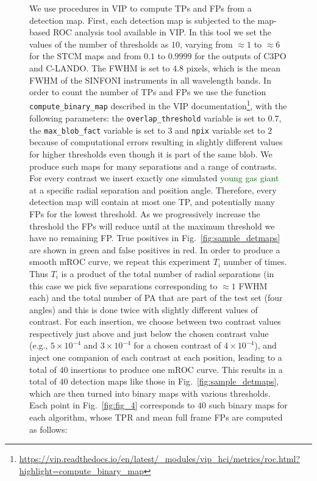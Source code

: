 \documentclass{aa}
\newcommand{\newchange}[1]{\textcolor{darkgreen}{#1}}
\begin{document}
{{{\begin{figure}[t]
{We use procedures in VIP \citep{2017AJGomezVIP,2023Christiaens} to compute TPs and FPs from a detection map. First, each detection map is subjected to the map-based ROC analysis tool available in VIP. In this tool we set the values of the number of thresholds as $10$, varying from $\approx 1$ to $\approx 6$ for the STCM maps and from $0.1$ to $0.9999$ for the outputs of C3PO and C-LANDO. The FWHM is set to $4.8$ pixels, which is the mean FWHM of the SINFONI instruments in all wavelength bands. 
In order to count the number of TPs and FPs we use the function \texttt{compute\_binary\_map} described in the VIP documentation\footnote{\url{https://vip.readthedocs.io/en/latest/_modules/vip_hci/metrics/roc.html?highlight=compute_binary_map}}, with the following parameters: the \texttt{overlap\_threshold} variable is set to $0.7$, the \texttt{max\_blob\_fact} variable is set to $3$ and \texttt{npix} variable set to $2$ because of computational errors resulting in slightly different values for higher thresholds even though it is part of the same blob.
We produce such maps for many separations and a range of contrasts.
For every contrast we insert exactly one simulated \newchange{young gas giant} at a specific radial separation and position angle.
Therefore, every detection map will contain at most one TP, and potentially many FPs for the lowest threshold. 
As we progressively increase the threshold the FPs will reduce until at the maximum threshold we have no remaining FP. 
True positives in Fig.~\ref{fig:sample_detmaps} are shown in green and false positives in red.
In order to produce a smooth mROC curve, we repeat this experiment $T_{i}$ number of times.
Thus $T_{i}$ is a product of the total number of radial separations (in this case we pick five separations corresponding to $\approx 1$ FWHM each) and the total number of PA that are part of the test set (four angles) and this is done twice with slightly different values of contrast.
For each insertion, we choose between two contrast values respectively just above and just below the chosen contrast value (e.g., $5\times10^{-4}$ and $3\times10^{-4}$ for a chosen contrast of $4\times10^{-4}$), and inject one companion of each contrast at each position, leading to a total of $40$ insertions to produce one mROC curve.
This results in a total of $40$ detection maps like those in Fig.~\ref{fig:sample_detmaps}, which are then turned into binary maps with various thresholds. 
Each point in Fig.~\ref{fig:fig_4} corresponds to $40$ such binary maps for each algorithm, whose TPR and mean full frame FPs are computed as follows:
}
\end{figure}}}}
\end{document}
